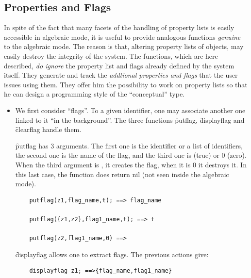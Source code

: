 \subsection{Properties and Flags}
In spite of the fact that many facets of the handling of
property lists is easily accessible in algebraic mode, it is useful to
provide analogous functions \emph{genuine} to the algebraic mode. The reason is
that, altering property lists of objects, may easily destroy the integrity
of the system. The functions, which are here described, \emph{do ignore}
the property list and flags already defined by the system itself. They
generate and track the \emph{addtional properties and flags} that the user
issues using them. They offer him
the  possibility to work on property lists so
that he can design a programming style of the ``conceptual'' type.
\begin{itemize}
\item[i.] We first consider ``flags''.
%
%
%
\hypertarget{operator:PUTFLAG}{}%
\hypertarget{operator:DISPLAYFLAG}{}%
\hypertarget{operator:CLEARFLAG}{}%
To a given identifier, one may
associate another one linked to it ``in the background''. The  three
functions \f{putflag}, \f{displayflag} and \f{clearflag} handle them.

\f{putflag} has 3 arguments. The first one is the identifier or a list
of identifiers, the second one is the name of the flag,
and the third one is  (true) or 0 (zero).
When the third argument is , it creates the flag, when it is 0 it
destroys it. In this last case, the function does return nil (not seen
inside the algebraic mode).
\begin{verbatim}
    putflag(z1,flag_name,t); ==> flag_name

    putflag({z1,z2},flag1_name,t); ==> t

    putflag(z2,flag1_name,0) ==>
\end{verbatim}
\f{displayflag} allows one to extract flags. The previous actions give:
\begin{verbatim}
    displayflag z1; ==>{flag_name,flag1_name}


\end{verbatim}
\end{itemize}
